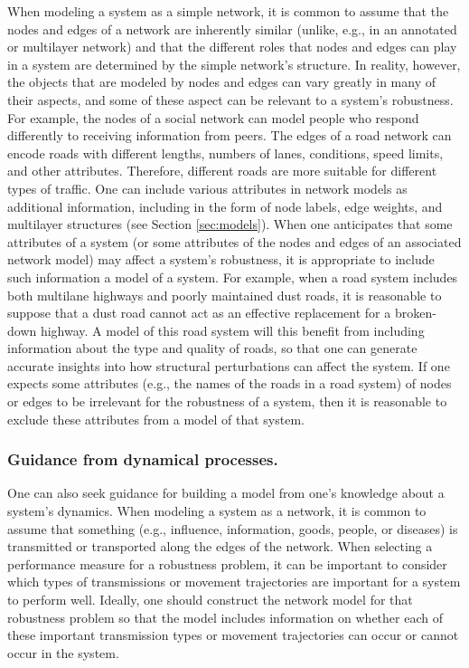 \documentclass{comnet-mod}
\begin{document}
When modeling a system as a simple network, it is common to assume that the nodes and edges of a network are 
inherently similar (unlike, e.g., in an annotated or multilayer network) and that the different roles that nodes and edges can play in a system are determined by the simple network's structure. In reality, however, the objects that are modeled by nodes and edges can vary greatly in many of their aspects, and some of these aspect can be relevant to a system's robustness. For example, the nodes of a social network can model people who respond differently to receiving information from peers. The edges of a road network can encode roads with different lengths, numbers of lanes, conditions, speed limits, and other attributes. Therefore, different roads are more suitable for different types of traffic. One can include various attributes in network models as additional information, including in the form of node labels, edge weights, and multilayer structures (see Section \ref{sec:models}). When one anticipates that some attributes of a system (or some attributes of the nodes and edges of an associated network model) may affect a system's robustness, it is appropriate to include such information a model of a system. 
For example, when a road system includes both multilane highways and poorly maintained dust roads, it is reasonable to suppose that a dust road cannot act as an effective replacement for a broken-down highway. A model of this road system will this benefit from including information about the type and quality of roads, so that one can generate accurate insights into how structural perturbations can affect the system. If one expects some attributes (e.g., the names of the roads in a road system) of nodes or edges to be irrelevant for the robustness of a system, then it is reasonable to exclude these attributes from a model of that system.


\subsubsection{Guidance from dynamical processes.}

One can also seek guidance for building a model from one's knowledge about a system's dynamics. When modeling a system as a network, it is common to assume that something (e.g., influence, information, goods, people, or diseases) is transmitted or transported along the edges of the network. When selecting a performance measure for a robustness problem, it can be important to consider which types of transmissions or movement trajectories are important for a system to perform well. Ideally, one should construct the network model for that robustness problem so that the model includes information on whether each of these important transmission types or movement trajectories can occur or cannot occur in the system. 
\end{document}
